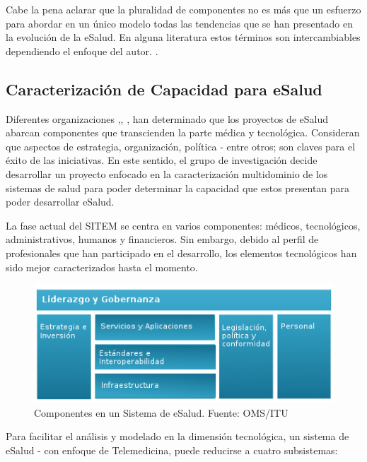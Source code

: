 Cabe la pena aclarar que la pluralidad de componentes no es más que un esfuerzo para abordar en un único modelo todas las tendencias que se han presentado en la evolución de la eSalud. En alguna literatura estos términos son intercambiables dependiendo el enfoque del autor. \cite{oms2010}.

\subsection{Caracterización de Capacidad para eSalud}

Diferentes organizaciones \cite{ops2011},\cite{oms2016}, \cite{ituoms2012}, han determinado que los proyectos de eSalud abarcan componentes que transcienden la parte médica y tecnológica. Consideran que aspectos de estrategia, organización, política - entre otros; son claves para el éxito de las iniciativas. En este sentido, el grupo de investigación decide desarrollar un proyecto enfocado en la caracterización multidominio de los sistemas de salud para poder determinar la capacidad que estos presentan para poder desarrollar eSalud. 

La fase actual del SITEM se centra en varios componentes: médicos, tecnológicos, administrativos, humanos y financieros. Sin embargo, debido al perfil de profesionales que han participado en el desarrollo, los elementos tecnológicos han sido mejor caracterizados hasta el momento.

\begin{figure}
 \centering
 \includegraphics{red_1.png}
 \caption{Componentes en un Sistema de eSalud. Fuente: OMS/ITU}
 \label{subcomponentes}
\end{figure}

Para facilitar el análisis y modelado en la dimensión tecnológica, un sistema de eSalud - con enfoque de Telemedicina, puede reducirse a cuatro subsistemas: \cite{aparicio2003}


